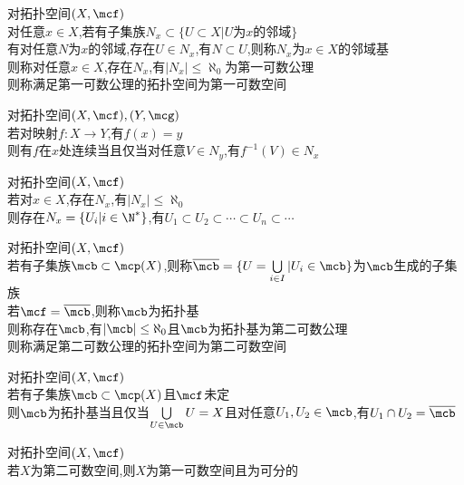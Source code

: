 \begin{dingyi}
对拓扑空间$(X,\mcf)$\\
对任意$x\in X$,若有子集族$N_{x}\subset\{U\subset X|U\text{为}x\text{的邻域}\}$\\
有对任意$N$为$x$的邻域,存在$U\in N_{x}$,有$N\subset U$,则称$N_{x}$为$x\in X$的邻域基\\
则称对任意$x\in X$,存在$N_{x}$,有$|N_{x}|\leq\aleph_0$为第一可数公理\\
则称满足第一可数公理的拓扑空间为第一可数空间
\end{dingyi}

\begin{dingli}
对拓扑空间$(X,\mcf),(Y,\mcg)$\\
若对映射$f:X\to Y$,有$f(x)=y$\\
则有$f$在$x$处连续当且仅当对任意$V\in N_{y}$,有$f^{-1}(V)\in N_{x}$
\end{dingli}

\begin{dingli}
对拓扑空间$(X,\mcf)$\\
若对$x\in X$,存在$N_{x}$,有$|N_{x}|\leq\aleph_{0}$\\
则存在$N_{x}=\{U_{i}|i\in \N^*\}$,有$U_{1}\subset U_2\subset\cdots\subset U_{n}\subset\cdots$
\end{dingli}

\begin{dingyi}
对拓扑空间$(X,\mcf)$\\
若有子集族$\mcb\subset \mcp(X)$,则称$\overline{\mcb}=\{U=\bigcup\limits_{i\in I}|U_{i}\in \mcb\}$为$\mcb$生成的子集族\\
若$\mcf=\overline{\mcb}$,则称$\mcb$为拓扑基\\
则称存在$\mcb$,有$|\mcb|\leq\aleph_0$且$\mcb$为拓扑基为第二可数公理\\
则称满足第二可数公理的拓扑空间为第二可数空间
\end{dingyi}

\begin{dingli}
对拓扑空间$(X,\mcf)$\\
若有子集族$\mcb\subset \mcp(X)$且$\mcf$未定\\
则$\mcb$为拓扑基当且仅当$\bigcup\limits_{U\in\mcb}U=X$且对任意$U_1,U_2\in \mcb$,有$U_1\cap U_2=\overline{\mcb}$
\end{dingli}

\begin{dingli}
对拓扑空间$(X,\mcf)$\\
若$X$为第二可数空间,则$X$为第一可数空间且为可分的
\end{dingli}

